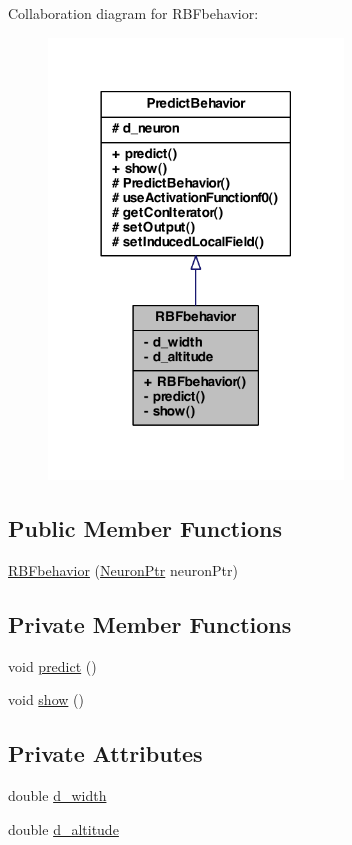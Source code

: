 Collaboration diagram for RBFbehavior:
\nopagebreak
\begin{figure}[H]
\begin{center}
\leavevmode
\includegraphics[width=222pt]{class_r_b_fbehavior__coll__graph}
\end{center}
\end{figure}
\subsection*{Public Member Functions}
\begin{DoxyCompactItemize}
\item 
\hyperlink{class_r_b_fbehavior_a5122dd22cb9a6be24175afc410a82f35}{RBFbehavior} (\hyperlink{_a_m_o_r_e_8h_ac1ea936c2c7728eb382278131652fef4}{NeuronPtr} neuronPtr)
\end{DoxyCompactItemize}
\subsection*{Private Member Functions}
\begin{DoxyCompactItemize}
\item 
void \hyperlink{class_r_b_fbehavior_ac14521848163e04810a6d038aef81896}{predict} ()
\item 
void \hyperlink{class_r_b_fbehavior_a96b123a5b657e46946c3ff98ea78f5de}{show} ()
\end{DoxyCompactItemize}
\subsection*{Private Attributes}
\begin{DoxyCompactItemize}
\item 
double \hyperlink{class_r_b_fbehavior_a6b37a2973f5e8390e37333e81de26077}{d\_\-width}
\item 
double \hyperlink{class_r_b_fbehavior_a831ab08f316756149ff37a92098f7033}{d\_\-altitude}
\end{DoxyCompactItemize}


